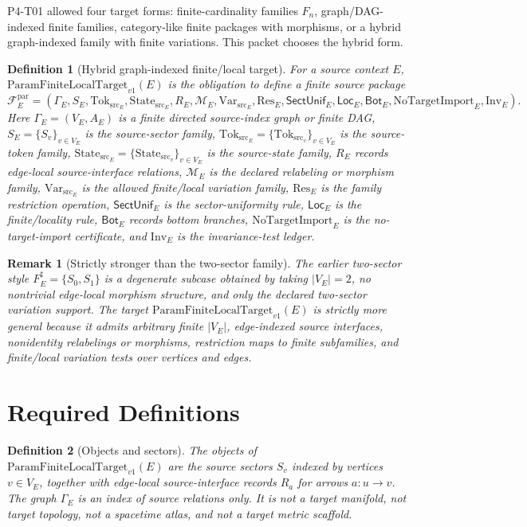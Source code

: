 \documentclass[11pt]{article}
\newcommand{\PFLFT}{\mathrm{ParamFiniteLocalTarget}_{v1}}
\newcommand{\Graph}{\Gamma}
\newcommand{\SrcTok}{\mathrm{Tok}_{\mathrm{src}}}
\newcommand{\SrcSt}{\mathrm{State}_{\mathrm{src}}}
\newcommand{\VarSrc}{\mathrm{Var}_{\mathrm{src}}}
\newcommand{\Restrict}{\mathrm{Res}}
\newcommand{\NoTargetImport}{\mathrm{NoTargetImport}}
\newcommand{\Inv}{\mathrm{Inv}}
\newtheorem{definition}{Definition}
\newtheorem{remark}{Remark}
\begin{document}
P4-T01 allowed four target forms: finite-cardinality families \(F_n\),
graph/DAG-indexed finite families, category-like finite packages with
morphisms, or a hybrid graph-indexed family with finite variations. This
packet chooses the hybrid form.

\begin{definition}[Hybrid graph-indexed finite/local target]
For a source context \(E\), \(\PFLFT(E)\) is the obligation to define a finite
source package
\[
  \mathcal{F}^{\mathrm{par}}_E =
  (\Graph_E,S_E,\SrcTok_E,\SrcSt_E,R_E,\mathcal{M}_E,
   \VarSrc_E,\Restrict_E,\mathsf{SectUnif}_E,\mathsf{Loc}_E,
   \mathsf{Bot}_E,\NoTargetImport_E,\Inv_E).
\]
Here \(\Graph_E=(V_E,A_E)\) is a finite directed source-index graph or finite
DAG, \(S_E=\{S_v\}_{v\in V_E}\) is the source-sector family,
\(\SrcTok_E=\{\SrcTok_v\}_{v\in V_E}\) is the source-token family,
\(\SrcSt_E=\{\SrcSt_v\}_{v\in V_E}\) is the source-state family, \(R_E\)
records edge-local source-interface relations, \(\mathcal{M}_E\) is the
declared relabeling or morphism family, \(\VarSrc_E\) is the allowed
finite/local variation family, \(\Restrict_E\) is the family restriction
operation, \(\mathsf{SectUnif}_E\) is the sector-uniformity rule,
\(\mathsf{Loc}_E\) is the finite/locality rule, \(\mathsf{Bot}_E\) records
bottom branches, \(\NoTargetImport_E\) is the no-target-import certificate,
and \(\Inv_E\) is the invariance-test ledger.
\end{definition}

\begin{remark}[Strictly stronger than the two-sector family]
The earlier two-sector style \(F_E^\sharp=\{S_0,S_1\}\) is a degenerate
subcase obtained by taking \(|V_E|=2\), no nontrivial edge-local morphism
structure, and only the declared two-sector variation support. The target
\(\PFLFT(E)\) is strictly more general because it admits arbitrary finite
\(|V_E|\), edge-indexed source interfaces, nonidentity relabelings or
morphisms, restriction maps to finite subfamilies, and finite/local variation
tests over vertices and edges.
\end{remark}

\section{Required Definitions}

\begin{definition}[Objects and sectors]
The objects of \(\PFLFT(E)\) are the source sectors \(S_v\) indexed by
vertices \(v\in V_E\), together with edge-local source-interface records
\(R_a\) for arrows \(a:u\to v\). The graph \(\Graph_E\) is an index of source
relations only. It is not a target manifold, not target topology, not a
spacetime atlas, and not a target metric scaffold.
\end{definition}
\end{document}
